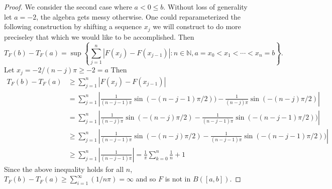\documentclass[11pt]{amsart}
\theoremstyle{definition}
\numberwithin{theorem}{section}
\numberwithin{definition}{section}
\numberwithin{equation}{section}
\begin{document}
\begin{proof}
 	We consider the second case where $a < 0 \leq b$. Without loss of generality let $a = -2$, the algebra gets messy otherwise. 
	One could reparameterized the following construction by shifting a sequence $x_j$ we will construct to do more preciseley that which we would like to be accomplished. Then 
	\begin{equation*}
	 	T_F(b) - T_F(a) = \sup\left\{ \sum_{j=1}^n |F(x_j) - F(x_{j-1}) |: n \in\mathbb{N},  a = x_0 < x_1 < \cdots < x_n = b \right\}.
	 \end{equation*} 
	 Let $x_{j} = -2/{(n-j)\pi} \geq -2 = a$ Then 
	 \begin{equation*}
	 \begin{aligned}
	 	T_F(b) - T_F(a) &\geq \sum_{j=1}^n |F(x_j) - F(x_{j-1})|\\
	 	&= \sum_{j=1}^n \left| \frac{1}{{(n-j-1)\pi}} \sin(-(n-j-1)\pi/2)) - \frac{1}{{(n-j)\pi}} \sin(-(n-j)\pi/2) \right| \\
	 	&= \sum_{j=1}^n \left|  \frac{1}{{(n-j)\pi}} \sin(-(n-j)\pi/2) - \frac{1}{{(n-j-1)\pi}} \sin(-(n-j-1)\pi/2))\right| \\
	 	&\geq \sum_{j=1}^n \left|\frac{1}{{(n-j-1)\pi}} \sin(-(n-j)\pi/2)  - \frac{1}{{(n-j-1)\pi}} \sin(-(n-j-1)\pi/2))\right| \\
	 	&\geq  \sum_{j=1}^n  \left|\frac{1}{{(n-j-1)\pi}}\right| = \frac{1}{\pi}\sum_{k=0}^{n} \frac{1}{n} + 1
	 \end{aligned}
	 \end{equation*}
	 Since the above inequality holds for all $n$, $T_F(b) - T_F(a) \geq \sum_{i=1}^\infty (1/n\pi)  = \infty$ and so $F$ is not in $B([a,b]).$
\end{proof}
\end{document}
